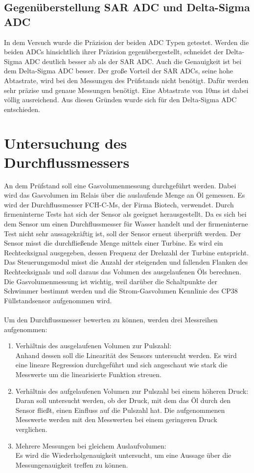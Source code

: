 \subsection{Gegenüberstellung SAR ADC und Delta-Sigma ADC}
In dem Versuch wurde die Präzision der beiden ADC Typen getestet. Werden die beiden ADCs hinsichtlich ihrer Präzision gegenübergestellt, schneidet der Delta-Sigma ADC deutlich besser ab als der SAR ADC. Auch die Genauigkeit ist bei dem Delta-Sigma ADC besser. Der große Vorteil der SAR ADCs, seine hohe Abtastrate, wird bei den Messungen des Prüfstands nicht benötigt. Dafür werden sehr präzise und genaue Messungen benötigt. Eine Abtastrate von 10ms ist dabei völlig ausreichend. Aus diesen Gründen wurde sich für den Delta-Sigma ADC entschieden.

\section{Untersuchung des Durchflussmessers}
An dem Prüfstand soll eine Gasvolumenmessung durchgeführt werden. Dabei wird das Gasvolumen im Relais über die auslaufende Menge an Öl gemessen. Es wird der Durchflussmesser FCH-C-Ms, der Firma Biotech, verwendet. Durch firmeninterne Tests hat sich der Sensor als geeignet herausgestellt. Da es sich bei dem Sensor um einen Durchflussmesser für Wasser handelt und der firmeninterne Test nicht sehr aussagekräftig ist, soll der Sensor erneut überprüft werden. Der Sensor misst die durchfließende Menge mittels einer Turbine. Es wird ein Rechtecksignal ausgegeben, dessen Frequenz der Drehzahl der Turbine entspricht. Das Steuerungsmodul misst die Anzahl der steigenden und fallenden Flanken des Rechtecksignals und soll daraus das Volumen des ausgelaufenen Öls berechnen.
\\
Die Gasvolumenmessung ist wichtig, weil darüber die Schaltpunkte der Schwimmer bestimmt werden und die Strom-Gasvolumen Kennlinie des CP38 Füllstandsensor aufgenommen wird.
\\
\\
Um den Durchflussmesser bewerten zu können, werden drei Messreihen aufgenommen:
\begin{enumerate}
	\item Verhältnis des ausgelaufenen Volumen zur Pulszahl:\\
	Anhand dessen soll die Linearität des Sensors untersucht werden. Es wird eine lineare Regression durchgeführt und sich angeschaut wie stark die Messwerte um die linearisierte Funktion streuen.
	\item Verhältnis des aufgelaufenen Volumen zur Pulszahl bei einem höheren Druck:\\
	Daran soll untersucht werden, ob der Druck, mit dem das Öl durch den Sensor fließt, einen Einfluss auf die Pulszahl hat. Die aufgenommenen Messwerte werden mit den Messwerten bei einem geringeren Druck verglichen.
	\item Mehrere Messungen bei gleichem Auslaufvolumen:\\
	Es wird die Wiederholgenauigkeit untersucht, um eine Aussage über die Messungenauigkeit treffen zu können.
\end{enumerate}

